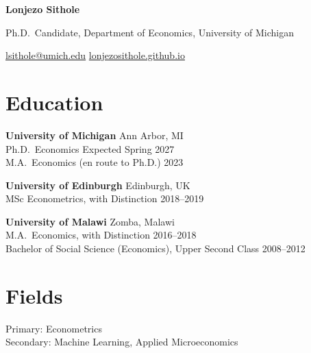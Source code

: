 \documentclass[11pt]{article}
\begin{document}
\thispagestyle{firstpage}

\begin{center}
{\LARGE\bfseries Lonjezo Sithole}

\vspace{0.3em}
Ph.D.\ Candidate, Department of Economics, University of Michigan
\end{center}

\vspace{-0.2em}
\begin{center}
\href{mailto:lsithole@umich.edu}{lsithole@umich.edu}
\quad\textbar\quad
\href{https://lonjezosithole.github.io/}{lonjezosithole.github.io}
\end{center}
\vspace{2em}

\section*{Education}
\textbf{University of Michigan} \hfill Ann Arbor, MI \\
Ph.D.\ Economics \hfill Expected Spring 2027 \\
M.A.\ Economics (en route to Ph.D.) \hfill 2023

\vspace{0.4em}
\textbf{University of Edinburgh} \hfill Edinburgh, UK \\
MSc Econometrics, with Distinction \hfill 2018--2019

\vspace{0.4em}
\textbf{University of Malawi} \hfill Zomba, Malawi \\
M.A.\ Economics, with Distinction \hfill 2016--2018 \\
Bachelor of Social Science (Economics), Upper Second Class \hfill 2008--2012

\section*{Fields}
Primary: Econometrics \\
Secondary: Machine Learning, Applied Microeconomics
\end{document}
